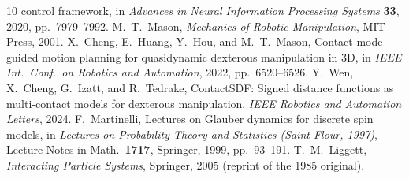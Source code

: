 \documentclass[11pt, openany]{report}
\theoremstyle{plain}
\theoremstyle{definition}
\theoremstyle{remark}
\begin{document}
\begin{thebibliography}{10}
control framework,
in \emph{Advances in Neural Information Processing Systems}
\textbf{33}, 2020, pp.~7979--7992.
M.~T.~Mason,
\emph{Mechanics of Robotic Manipulation},
MIT Press, 2001.
X.~Cheng, E.~Huang, Y.~Hou, and M.~T.~Mason,
Contact mode guided motion planning for quasidynamic dexterous
manipulation in 3D,
in \emph{IEEE Int.\ Conf.\ on Robotics and Automation}, 2022,
pp.~6520--6526.
Y.~Wen, X.~Cheng, G.~Izatt, and R.~Tedrake,
ContactSDF: Signed distance functions as multi-contact models for
dexterous manipulation,
\emph{IEEE Robotics and Automation Letters}, 2024.
F.~Martinelli,
Lectures on Glauber dynamics for discrete spin models,
in \emph{Lectures on Probability Theory and Statistics
(Saint-Flour, 1997)}, Lecture Notes in Math.~\textbf{1717},
Springer, 1999, pp.~93--191.
T.~M.~Liggett,
\emph{Interacting Particle Systems},
Springer, 2005 (reprint of the 1985 original).
\end{thebibliography}
\end{document}

